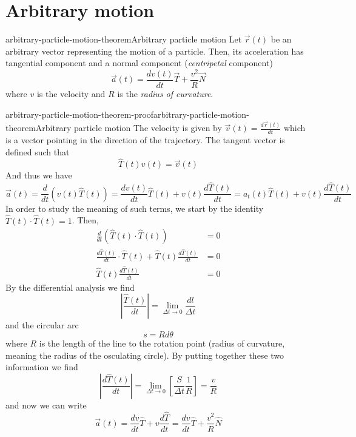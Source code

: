 \documentclass[preview]{standalone}
\begin{document}
\genpage

\section{Arbitrary motion}

\begin{snippettheorem}{arbitrary-particle-motion-theorem}{Arbitrary particle motion}
    Let \(\vec{r}(t)\) be an arbitrary vector representing the motion of a particle.
    Then, its acceleration has tangential component and a normal component (\emph{centripetal} component)
    \[
        \vec{a}(t) = \frac{dv(t)}{dt}\vec{T} + \frac{v^2}{R}\vec{N}
    \]
    where \(v\) is the velocity and \(R\) is the \emph{radius of curvature}.
\end{snippettheorem}

\begin{snippetproof}{arbitrary-particle-motion-theorem-proof}{arbitrary-particle-motion-theorem}{Arbitrary particle motion}
    The velocity is given by \(\vec{v}(t) = \frac{d\vec{r}(t)}{dt}\) which is a vector pointing in the direction of the trajectory.
    The tangent vector is defined such that
    \[
        \hat{T}(t) v(t) = \vec{v}(t)
    \]
    And thus we have
    \[
        \vec{a}(t) = \frac{d}{dt} \left(v(t)\hat{T}(t)\right) = \frac{dv(t)}{dt}\hat{T}(t) + v(t)\frac{d\hat{T}(t)}{dt} = a_t(t)\hat{T}(t) + v(t)\frac{d\hat{T}(t)}{dt}
    \]
    In order to study the meaning of such terms, we start by the identity \(\hat{T}(t) \cdot \hat{T}(t) = 1\).
    Then,
    \begin{align*}
        \frac{d}{dt} \left( \hat{T}(t) \cdot \hat{T}(t) \right) &= 0 \\
        \frac{d\hat{T}(t)}{dt} \cdot \hat{T}(t) + \hat{T}(t)\frac{d\hat{T}(t)}{dt} &= 0 \\
        \hat{T}(t)\frac{d\hat{T}(t)}{dt} &= 0 
    \end{align*}
    By the differential analysis we find
    \[
        \left|\frac{\hat{T}(t)}{dt}\right| = \lim_{\Delta t \to 0} \frac{dl}{\Delta t}
    \]
    and the circular arc
    \[
        s = Rd\theta
    \]
    where \(R\) is the length of the line to the rotation point (radius of curvature, meaning the radius of the osculating circle).
    By putting together these two information we find
    \[
        \left|\frac{d\hat{T}(t)}{dt}\right| = \lim_{\Delta t \to 0} \left[\frac{S}{\Delta t} \frac{1}{R}\right] = \frac{v}{R}
    \]
    and now we can write
    \[
        \vec{a}(t) = \frac{dv}{dt}\hat{T} + v\frac{d\hat{T}}{dt} = \frac{dv}{dt}\hat{T} + \frac{v^2}{R} \hat{N}
    \]
\end{snippetproof}
\end{document}
